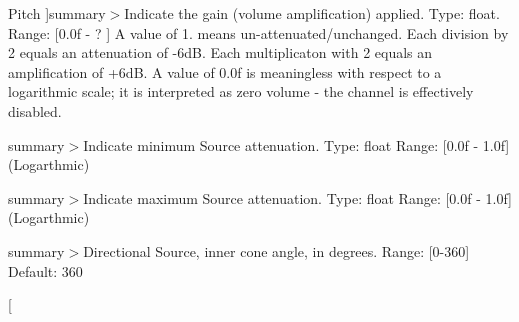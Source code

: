 \begin{Desc}
\begin{description}
{\hypertarget{namespace_open_t_k_1_1_audio_1_1_open_a_l_a04d9b7aaf9c70a9e06f053b2d98f5c46a87f800274a7f46c50e17114f89171e2e}{Pitch}\label{namespace_open_t_k_1_1_audio_1_1_open_a_l_a04d9b7aaf9c70a9e06f053b2d98f5c46a87f800274a7f46c50e17114f89171e2e}
}]summary$>$Indicate the gain (volume amplification) applied. Type\-: float. Range\-: \mbox{[}0.\-0f -\/ ? \mbox{]} A value of 1. means un-\/attenuated/unchanged. Each division by 2 equals an attenuation of -\/6d\-B. Each multiplicaton with 2 equals an amplification of +6d\-B. A value of 0.\-0f is meaningless with respect to a logarithmic scale; it is interpreted as zero volume -\/ the channel is effectively disabled.\item[{\em 
\hypertarget{namespace_open_t_k_1_1_audio_1_1_open_a_l_a04d9b7aaf9c70a9e06f053b2d98f5c46a35d72fa7d84f4ae67d705373d1d44b88}{Gain}\label{namespace_open_t_k_1_1_audio_1_1_open_a_l_a04d9b7aaf9c70a9e06f053b2d98f5c46a35d72fa7d84f4ae67d705373d1d44b88}
}]summary$>$Indicate minimum Source attenuation. Type\-: float Range\-: \mbox{[}0.\-0f -\/ 1.\-0f\mbox{]} (Logarthmic)\item[{\em 
\hypertarget{namespace_open_t_k_1_1_audio_1_1_open_a_l_a04d9b7aaf9c70a9e06f053b2d98f5c46ad7521e807a2e7fa485d13a710420b552}{Min\-Gain}\label{namespace_open_t_k_1_1_audio_1_1_open_a_l_a04d9b7aaf9c70a9e06f053b2d98f5c46ad7521e807a2e7fa485d13a710420b552}
}]summary$>$Indicate maximum Source attenuation. Type\-: float Range\-: \mbox{[}0.\-0f -\/ 1.\-0f\mbox{]} (Logarthmic)\item[{\em 
\hypertarget{namespace_open_t_k_1_1_audio_1_1_open_a_l_a04d9b7aaf9c70a9e06f053b2d98f5c46a333c7f27786ea92a2a05518ccf4caa90}{Max\-Gain}\label{namespace_open_t_k_1_1_audio_1_1_open_a_l_a04d9b7aaf9c70a9e06f053b2d98f5c46a333c7f27786ea92a2a05518ccf4caa90}
}]summary$>$Directional Source, inner cone angle, in degrees. Range\-: \mbox{[}0-\/360\mbox{]} Default\-: 360\item[{\em 
}
\end{description}
\end{Desc}
